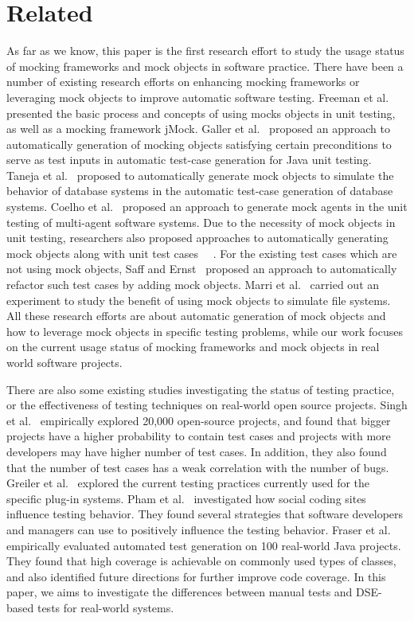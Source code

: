 \section{Related}
\label{sec:related}

As far as we know, this paper is the first research effort to study the usage status of mocking frameworks and mock objects in software practice. There have been a number of existing research efforts on enhancing mocking frameworks or leveraging mock objects to improve automatic software testing. Freeman et al.~\cite{IEEEhowto:kopka}~\cite{Freeman} presented the basic process and concepts of using mocks objects in unit testing, as well as a mocking framework jMock. Galler et al.~\cite{Galler} proposed an approach to automatically generation of mocking objects satisfying certain preconditions to serve as test inputs in automatic test-case generation for Java unit testing. Taneja et al.~\cite{Taneja} proposed to automatically generate mock objects to simulate the behavior of database systems in the automatic test-case generation of database systems. Coelho et al.~\cite{Coelho} proposed an approach to generate mock agents in the unit testing of multi-agent software systems. Due to the necessity of mock objects in unit testing, researchers also proposed approaches to automatically generating mock objects along with unit test cases ~\cite{woda}~\cite{Pasternak}. For the existing test cases which are not using mock objects, Saff and Ernst~\cite{Saff} proposed an approach to automatically refactor such test cases by adding mock objects. Marri et al.~\cite{Marri} carried out an experiment to study the benefit of using mock objects to simulate file systems. All these research efforts are about automatic generation of mock objects and how to leverage mock objects in specific testing problems, while our work focuses on the current usage status of mocking frameworks and mock objects in real world software projects. 

There are also some existing studies investigating the status of testing practice, or the effectiveness of testing techniques on real-world open source projects. Singh et al.~\cite{singh2013empirical} empirically explored 20,000 open-source projects, and found that bigger projects have a higher probability to contain test cases and projects with more developers may have higher number of test cases. In addition, they also found that the number of test cases has a weak correlation with the number of bugs. Greiler et al.~\cite{greiler2012test} explored the current testing practices currently used for the specific plug-in systems. Pham et al.~\cite{pham2013creating} investigated how social coding sites influence testing behavior. They found several strategies that software developers and managers can use to positively influence the testing behavior. Fraser et al.~\cite{fraser2012sound} empirically evaluated automated test generation on 100 real-world Java projects. They found that high coverage is achievable on commonly used types of classes, and also identified future directions for further improve code coverage. In this paper, we aims to investigate the differences between manual tests and DSE-based tests for real-world systems.
